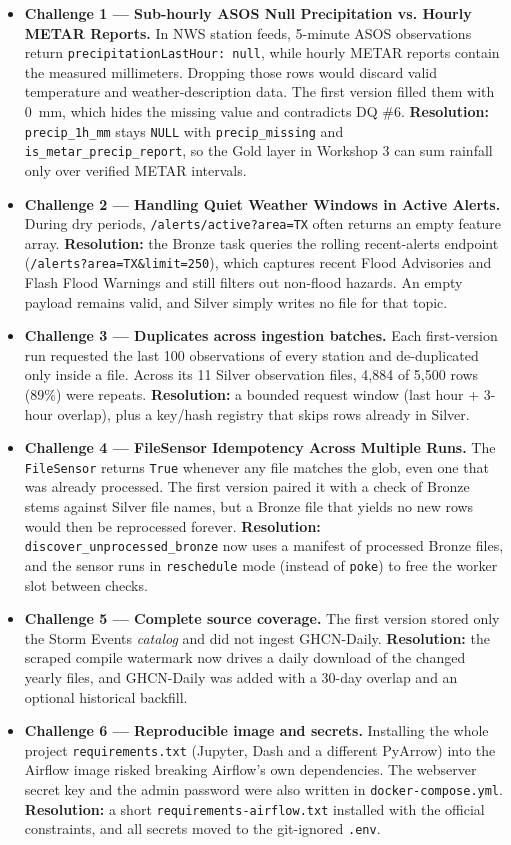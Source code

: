 \documentclass[stu, 12pt, letterpaper, donotrepeattitle, floatsintext, natbib]{apa7}
\begin{document}
\begin{itemize}
    \item \textbf{Challenge 1 --- Sub-hourly ASOS Null Precipitation vs. Hourly METAR Reports.} In NWS station feeds, 5-minute ASOS observations return \texttt{precipitationLastHour: null}, while hourly METAR reports contain the measured millimeters. Dropping those rows would discard valid temperature and weather-description data. The first version filled them with 0~mm, which hides the missing value and contradicts DQ \#6. \textbf{Resolution:} \texttt{precip\_1h\_mm} stays \texttt{NULL} with \texttt{precip\_missing} and \texttt{is\_metar\_precip\_report}, so the Gold layer in Workshop 3 can sum rainfall only over verified METAR intervals.
    \item \textbf{Challenge 2 --- Handling Quiet Weather Windows in Active Alerts.} During dry periods, \texttt{/alerts/active?area=TX} often returns an empty feature array. \textbf{Resolution:} the Bronze task queries the rolling recent-alerts endpoint (\texttt{/alerts?area=TX\&limit=250}), which captures recent Flood Advisories and Flash Flood Warnings and still filters out non-flood hazards. An empty payload remains valid, and Silver simply writes no file for that topic.
    \item \textbf{Challenge 3 --- Duplicates across ingestion batches.} Each first-version run requested the last 100 observations of every station and de-duplicated only inside a file. Across its 11 Silver observation files, 4,884 of 5,500 rows (89\%) were repeats. \textbf{Resolution:} a bounded request window (last hour + 3-hour overlap), plus a key/hash registry that skips rows already in Silver.
    \item \textbf{Challenge 4 --- FileSensor Idempotency Across Multiple Runs.} The \texttt{FileSensor} returns \texttt{True} whenever any file matches the glob, even one that was already processed. The first version paired it with a check of Bronze stems against Silver file names, but a Bronze file that yields no new rows would then be reprocessed forever. \textbf{Resolution:} \texttt{discover\_unprocessed\_bronze} now uses a manifest of processed Bronze files, and the sensor runs in \texttt{reschedule} mode (instead of \texttt{poke}) to free the worker slot between checks.
    \item \textbf{Challenge 5 --- Complete source coverage.} The first version stored only the Storm Events \emph{catalog} and did not ingest GHCN-Daily. \textbf{Resolution:} the scraped compile watermark now drives a daily download of the changed yearly files, and GHCN-Daily was added with a 30-day overlap and an optional historical backfill.
    \item \textbf{Challenge 6 --- Reproducible image and secrets.} Installing the whole project \texttt{requirements.txt} (Jupyter, Dash and a different PyArrow) into the Airflow image risked breaking Airflow's own dependencies. The webserver secret key and the admin password were also written in \texttt{docker-compose.yml}. \textbf{Resolution:} a short \texttt{requirements-airflow.txt} installed with the official constraints, and all secrets moved to the git-ignored \texttt{.env}.
\end{itemize}

\newpage
\renewcommand\refname{\large\textbf{References}}
\nocite{*}

\end{document}
